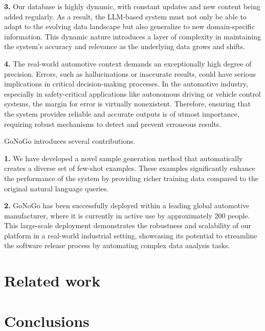 \textbf{3.} Our database is highly dynamic, with constant updates and new content being added regularly. As a result, the LLM-based system must not only be able to adapt to the evolving data landscape but also generalize to new domain-specific information. This dynamic nature introduces a layer of complexity in maintaining the system's accuracy and relevance as the underlying data grows and shifts.

\textbf{4.} The real-world automotive context demands an exceptionally high degree of precision. Errors, such as hallucinations or inaccurate results, could have serious implications in critical decision-making processes. In the automotive industry, especially in safety-critical applications like autonomous driving or vehicle control systems, the margin for error is virtually nonexistent. Therefore, ensuring that the system provides reliable and accurate outputs is of utmost importance, requiring robust mechanisms to detect and prevent erroneous results. 


\vspace{2cm}
GoNoGo introduces several contributions. 

\textbf{1.} We have developed a novel sample generation method that automatically creates a diverse set of few-shot examples. These examples significantly enhance the performance of the system by providing richer training data compared to the original natural language queries. 

\textbf{2.} GoNoGo has been successfully deployed within a leading global automotive manufacturer, where it is currently in active use by approximately 200 people. This large-scale deployment demonstrates the robustness and scalability of our platform in a real-world industrial setting, showcasing its potential to streamline the software release process by automating complex data analysis tasks.



\section{Related work}
\cite{openai2023structuredoutputs}
\section{Conclusions}
